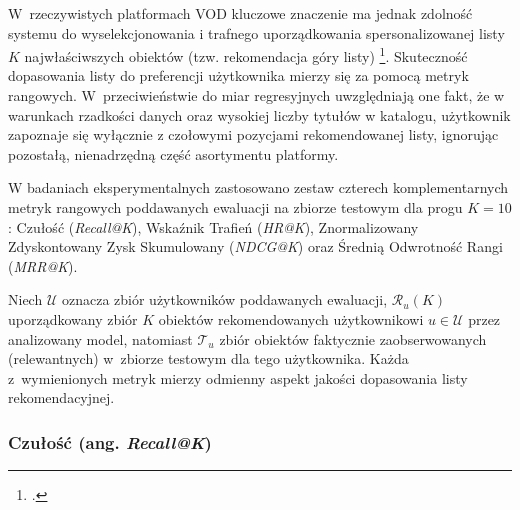 W~rzeczywistych platformach VOD kluczowe znaczenie ma jednak zdolność systemu do wyselekcjonowania i trafnego uporządkowania spersonalizowanej listy $K$ najwłaściwszych obiektów (tzw. rekomendacja góry listy) \footcite{steckEvaluationRecommendationsRatingprediction2013}. Skuteczność dopasowania listy do preferencji użytkownika mierzy się za pomocą metryk rangowych. W~przeciwieństwie do miar regresyjnych uwzględniają one fakt, że w warunkach rzadkości danych oraz wysokiej liczby tytułów w katalogu, użytkownik zapoznaje się wyłącznie z czołowymi pozycjami rekomendowanej listy, ignorując pozostałą, nienadrzędną część asortymentu platformy.

W badaniach eksperymentalnych zastosowano zestaw czterech komplementarnych metryk rangowych poddawanych ewaluacji na zbiorze testowym dla progu $K = 10$: Czułość (\textit{Recall@K}), Wskaźnik Trafień (\textit{HR@K}), Znormalizowany Zdyskontowany Zysk Skumulowany (\textit{NDCG@K}) oraz Średnią Odwrotność Rangi (\textit{MRR@K}).

Niech $\mathcal{U}$ oznacza zbiór użytkowników poddawanych ewaluacji, $\mathcal{R}_u(K)$ uporządkowany zbiór $K$ obiektów rekomendowanych użytkownikowi $u \in \mathcal{U}$ przez analizowany model, natomiast $\mathcal{T}_u$ zbiór obiektów faktycznie zaobserwowanych (relewantnych) w~zbiorze testowym dla tego użytkownika. Każda z~wymienionych metryk mierzy odmienny aspekt jakości dopasowania listy rekomendacyjnej.

\subsubsection{Czułość (ang. \textit{Recall@K})}

